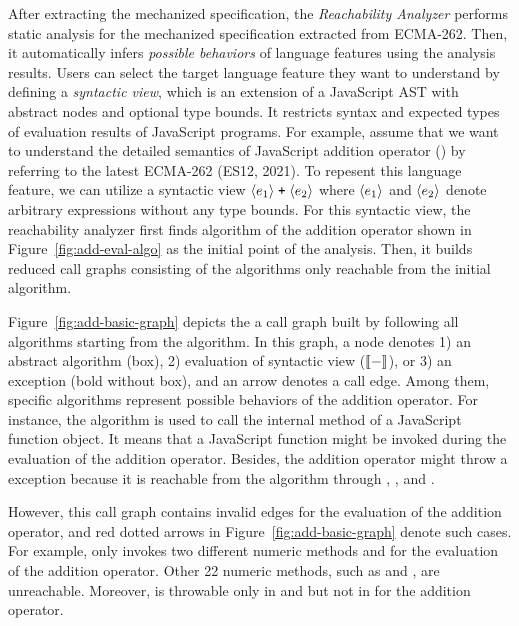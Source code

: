 After extracting the mechanized specification, the \textit{Reachability
Analyzer} performs static analysis for the mechanized specification extracted
from ECMA-262.  Then, it automatically infers \textit{possible behaviors} of
language features using the analysis results.  Users can select the target
language feature they want to understand by defining a \textit{syntactic view},
which is an extension of a JavaScript AST with abstract nodes and optional type
bounds.  It restricts syntax and expected types of evaluation results of
JavaScript programs.  For example, assume that we want to understand the
detailed semantics of JavaScript addition operator (\code{+}) by referring to
the latest ECMA-262 (ES12, 2021).  To repesent this language feature, we can
utilize a syntactic view $\langle e_1 \rangle \; \texttt{+} \; \langle e_2 \rangle$
where $\langle e_1 \rangle$ and $\langle e_2 \rangle$ denote arbitrary expressions
without any type bounds.  For this syntactic view, the reachability analyzer
first finds  algorithm of the addition operator shown in
Figure~\ref{fig:add-eval-algo} as the initial point of the analysis.  Then, it
builds reduced call graphs consisting of the algorithms only reachable from the
initial algorithm.

Figure~\ref{fig:add-basic-graph} depicts the a call graph built by following all
algorithms starting from the  algorithm.  In this graph, a
node denotes 1) an abstract algorithm (box), 2) evaluation of syntactic view
($\llbracket{-}\rrbracket$), or 3) an exception (bold without box), and an arrow denotes a call
edge.  Among them, specific algorithms represent possible behaviors of the
addition operator.  For instance, the  algorithm is used to call the
\eswrd{[[Call]]} internal method of a JavaScript function object.  It means that
a JavaScript function might be invoked during the evaluation of the addition
operator.  Besides, the addition operator might throw a 
exception because it is reachable from the  algorithm through
, , and .

However, this call graph contains invalid edges for the evaluation of the
addition operator, and red dotted arrows in Figure~\ref{fig:add-basic-graph}
denote such cases.  For example,  only
invokes two different numeric methods  and
 for the evaluation of the addition operator.  Other 22
numeric methods, such as  and ,
are unreachable.  Moreover,  is throwable only in
 and  but not in  for the
addition operator.

